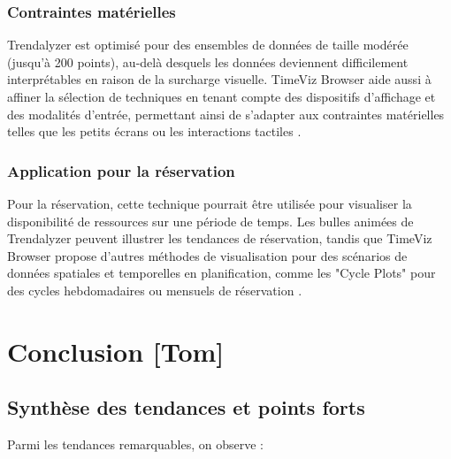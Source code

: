 \documentclass[runningheads]{llncs}
\begin{document}
\subsubsection{Contraintes matérielles}  
Trendalyzer est optimisé pour des ensembles de données de taille modérée (jusqu'à 200 points), au-delà desquels les données deviennent difficilement interprétables en raison de la surcharge visuelle. TimeViz Browser aide aussi à affiner la sélection de techniques en tenant compte des dispositifs d’affichage et des modalités d’entrée, permettant ainsi de s’adapter aux contraintes matérielles telles que les petits écrans ou les interactions tactiles \cite{aigner_visualization_2023}.

\subsubsection{Application pour la réservation}  
Pour la réservation, cette technique pourrait être utilisée pour visualiser la disponibilité de ressources sur une période de temps. Les bulles animées de Trendalyzer peuvent illustrer les tendances de réservation, tandis que TimeViz Browser propose d'autres méthodes de visualisation pour des scénarios de données spatiales et temporelles en planification, comme les "Cycle Plots" pour des cycles hebdomadaires ou mensuels de réservation \cite{aigner_visualization_2023}.

\section{Conclusion [Tom]}
\subsection{Synthèse des tendances et points forts}

Parmi les tendances remarquables, on observe :
\end{document}
